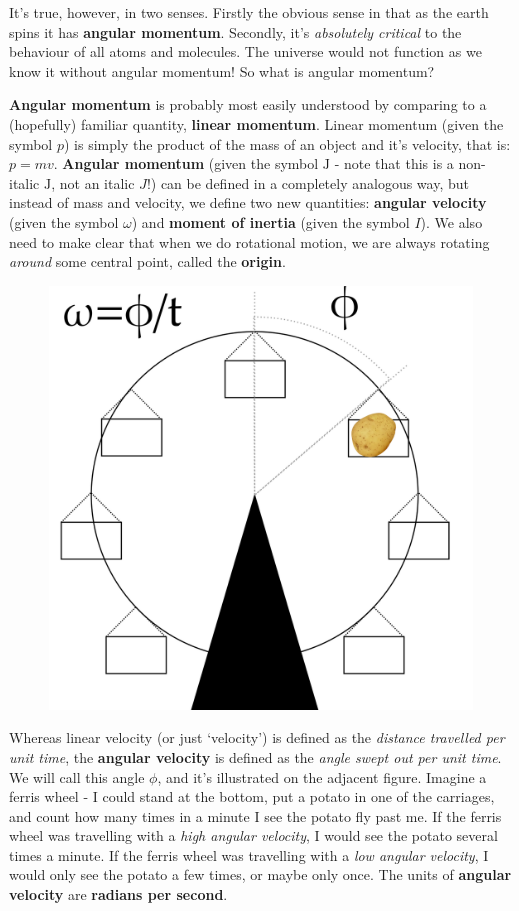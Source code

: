 \documentclass{memoir}[11pt,oneside,a4paper,openany]
\newcommand{\Jc}{\ensuremath{\mathrm{J}}}
\begin{document}
It's true, however, in two senses. Firstly the obvious sense in that as the earth spins it has \textbf{angular momentum}. Secondly, it's \emph{absolutely critical} to the behaviour of all atoms and molecules. The universe would not function as we know it without angular momentum! So what is angular momentum?

\textbf{Angular momentum} is probably most easily understood by comparing to a (hopefully) familiar quantity, \textbf{linear momentum}. Linear momentum (given the symbol $p$) is simply the product of the mass of an object and it's velocity, that is: $p = mv$. \textbf{Angular momentum} (given the symbol $\Jc$ - note that this is a non-italic $\mathrm{J}$, not an italic $J$!) can be defined in a completely analogous way, but instead of mass and velocity, we define two new quantities: \textbf{angular velocity} (given the symbol $\omega$) and \textbf{moment of inertia} (given the symbol $I$). We also need to make clear that when we do rotational motion, we are always rotating \emph{around} some central point, called the \textbf{origin}. 

\begin{figure}
	\centering
	\includegraphics[width=0.9\linewidth]{angular_velocity.png}
\end{figure}
Whereas linear velocity (or just `velocity') is defined as the \emph{distance travelled per unit time}, the \textbf{angular velocity} is defined as the \emph{angle swept out per unit time}. We will call this angle $\phi$, and it's illustrated on the adjacent figure. Imagine a ferris wheel - I could stand at the bottom, put a potato in one of the carriages, and count how many times in a minute I see the potato fly past me. If the ferris wheel was travelling with a \emph{high angular velocity}, I would see the potato several times a minute. If the ferris wheel was travelling with a \emph{low angular velocity}, I would only see the potato a few times, or maybe only once. The units of \textbf{angular velocity} are \textbf{radians per second}. 
\end{document}
